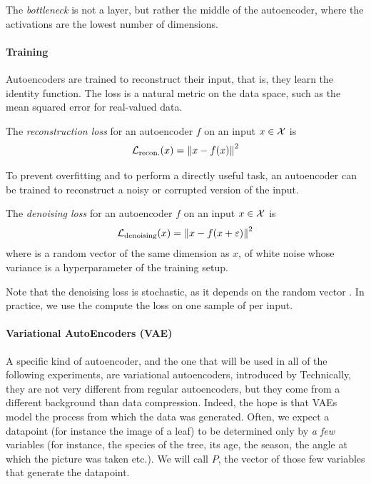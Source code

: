 \documentclass[]{scrarticle}
\begin{document}
The \emph{bottleneck} is not a layer, but rather the middle of the autoencoder,
where the activations are the lowest number of dimensions.

\paragraph{Training}
Autoencoders are trained to reconstruct their input,
that is, they learn the identity function. The loss is a natural metric
on the data space, such as the mean squared error for real-valued data.

\begin{definition}
  The \emph{reconstruction loss} for an autoencoder $f$ on an input $x \in \mathcal X$
  is
  \[
    \mathcal L_{\text{recon.}}(x) = \left\| x - f(x) \right\|^2
  \]
\end{definition}

To prevent overfitting and to perform a directly useful task,
an autoencoder can be trained to reconstruct a noisy or corrupted
version of the input.
\begin{definition}
  The \emph{denoising loss} for an autoencoder $f$ on an input $x \in \mathcal X$ is
  \[
    \mathcal L_{\text{denoising}}(x) = \left\| x - f(x + \varepsilon) \right\|^2
  \]
  where \e is a random vector of the same dimension as $x$, of white noise
  whose variance is a hyperparameter of the training setup.

  Note that the denoising loss is stochastic, as it depends on the random
  vector \e. In practice, we use the compute the loss on one sample of \e
  per input.
\end{definition}

\paragraph{Variational AutoEncoders (VAE)}
A specific kind of autoencoder, and the one that will be
used in all of the following experiments,
are variational autoencoders,
introduced by \cite{Kingma2013AutoEncodingVB}
Technically, they are not very different from regular autoencoders,
but they come from a different background than data compression.
Indeed, the hope is that VAEs model the process from which the data was generated.
Often, we expect a datapoint (for instance the image of a leaf) to be determined
only by \textit{a few} variables (for instance, the species of the tree, its age,
the season, the angle at which the picture was taken etc.).
We will call $P$, the vector of those few variables that generate the datapoint.
\end{document}
